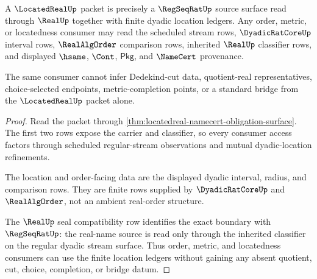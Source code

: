 \begin{theorem}
\label{thm:locatedreal-realup-regseqrat-boundary}
A $\LocatedRealUp$ packet is precisely a $\RegSeqRatUp$ source surface read through $\RealUp$ together with finite dyadic location ledgers. Any order, metric, or locatedness consumer may read the scheduled stream rows, $\DyadicRatCoreUp$ interval rows, $\RealAlgOrder$ comparison rows, inherited $\RealUp$ classifier rows, and displayed $\hsame$, $\Cont$, $\mathsf{Pkg}$, and $\NameCert$ provenance.

The same consumer cannot infer Dedekind-cut data, quotient-real representatives, choice-selected endpoints, metric-completion points, or a standard bridge from the $\LocatedRealUp$ packet alone.
\end{theorem}
\begin{proof}
Read the packet through \autoref{thm:locatedreal-namecert-obligation-surface}. The first two rows expose the carrier and classifier, so every consumer access factors through scheduled regular-stream observations and mutual dyadic-location refinements.

The location and order-facing data are the displayed dyadic interval, radius, and comparison rows. They are finite rows supplied by $\DyadicRatCoreUp$ and $\RealAlgOrder$, not an ambient real-order structure.

The $\RealUp$ seal compatibility row identifies the exact boundary with $\RegSeqRatUp$: the real-name source is read only through the inherited classifier on the regular dyadic stream surface. Thus order, metric, and locatedness consumers can use the finite location ledgers without gaining any absent quotient, cut, choice, completion, or bridge datum.
\end{proof}

